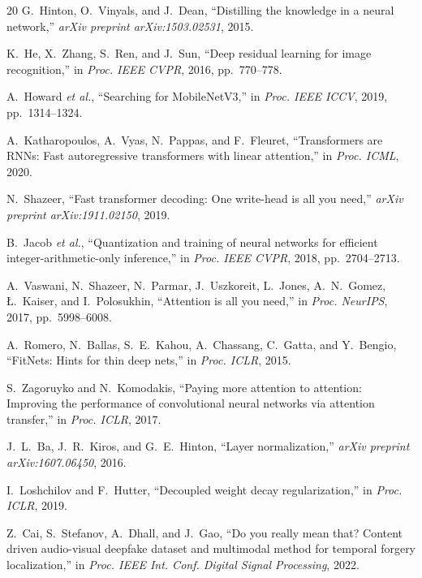 \documentclass[lettersize,journal]{IEEEtran}
\begin{document}
\begin{thebibliography}{20}
G.~Hinton, O.~Vinyals, and J.~Dean, ``Distilling the knowledge in a neural network,'' \emph{arXiv preprint arXiv:1503.02531}, 2015.

K.~He, X.~Zhang, S.~Ren, and J.~Sun, ``Deep residual learning for image recognition,'' in \emph{Proc. IEEE CVPR}, 2016, pp.~770--778.

A.~Howard \textit{et al.}, ``Searching for MobileNetV3,'' in \emph{Proc. IEEE ICCV}, 2019, pp.~1314--1324.

A.~Katharopoulos, A.~Vyas, N.~Pappas, and F.~Fleuret, ``Transformers are RNNs: Fast autoregressive transformers with linear attention,'' in \emph{Proc. ICML}, 2020.

N.~Shazeer, ``Fast transformer decoding: One write-head is all you need,'' \emph{arXiv preprint arXiv:1911.02150}, 2019.

B.~Jacob \textit{et al.}, ``Quantization and training of neural networks for efficient integer-arithmetic-only inference,'' in \emph{Proc. IEEE CVPR}, 2018, pp.~2704--2713.

A.~Vaswani, N.~Shazeer, N.~Parmar, J.~Uszkoreit, L.~Jones, A.~N.~Gomez, \L.~Kaiser, and I.~Polosukhin, ``Attention is all you need,'' in \emph{Proc. NeurIPS}, 2017, pp.~5998--6008.

A.~Romero, N.~Ballas, S.~E.~Kahou, A.~Chassang, C.~Gatta, and Y.~Bengio, ``FitNets: Hints for thin deep nets,'' in \emph{Proc. ICLR}, 2015.

S.~Zagoruyko and N.~Komodakis, ``Paying more attention to attention: Improving the performance of convolutional neural networks via attention transfer,'' in \emph{Proc. ICLR}, 2017.

J.~L.~Ba, J.~R.~Kiros, and G.~E.~Hinton, ``Layer normalization,'' \emph{arXiv preprint arXiv:1607.06450}, 2016.

I.~Loshchilov and F.~Hutter, ``Decoupled weight decay regularization,'' in \emph{Proc. ICLR}, 2019.

Z.~Cai, S.~Stefanov, A.~Dhall, and J.~Gao, ``Do you really mean that? Content driven audio-visual deepfake dataset and multimodal method for temporal forgery localization,'' in \emph{Proc. IEEE Int. Conf. Digital Signal Processing}, 2022.

\end{thebibliography}

\balance
\end{document}
